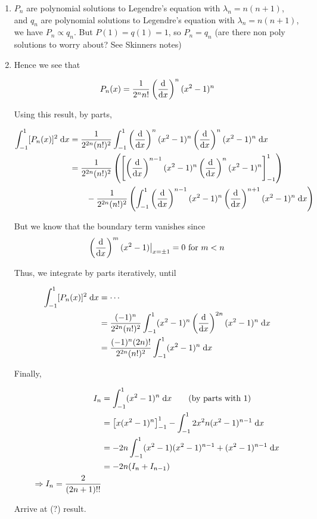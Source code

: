 \documentclass[a4paper]{article}
\begin{document}
\begin{enumerate}
	\item $ P_{n} $ are polynomial solutions to Legendre's equation with $ \lambda_{n} = n(n+1) $, and $ q_{n} $ are polynomial solutions to Legendre's equation with $ \lambda_{n} = n(n+1) $, we have $ P_{n} \propto q_{n} $. But $ P(1) = q(1) = 1 $, so $ P_{n} = q_{n} $ (are there non poly solutions to worry about? See Skinners notes) 
	
	\item Hence we see that
	
	\[ P_{n}(x) = \frac{1}{2^{n} n!} \left(  \frac{\mathrm{d} }{\mathrm{d} x}   \right)^{n} (x^{2} - 1)^{n}   \]
	
	Using this result, by parts, 
	
	\begin{align*}
	\int_{-1}^{1} [  P_{n} (x)  ]^{2} \; \mathrm{d} x & = \frac{1}{2^{2n} (n!)^{2}} \int_{-1}^{1} \left(  \frac{\mathrm{d} }{\mathrm{d} x}   \right)^{n} (x^{2} - 1)^{n} \left(  \frac{\mathrm{d} }{\mathrm{d} x}   \right)^{n} (x^{2} - 1)^{n} \; \mathrm{d} x   \\
	& = \frac{1}{2^{2n} (n!)^{2}} \left( \left[  \left(  \frac{\mathrm{d} }{\mathrm{d} x}   \right)^{n-1} (x^{2} - 1)^{n} \left(  \frac{\mathrm{d} }{\mathrm{d} x}   \right)^{n} (x^{2} - 1)^{n} \right]_{-1}^{1} \right)  \\
	& \qquad - \frac{1}{2^{2n} (n!)^{2}} \left(     \int_{-1}^{1} \left(  \frac{\mathrm{d} }{\mathrm{d} x}   \right)^{n-1} (x^{2} - 1)^{n} \left(  \frac{\mathrm{d} }{\mathrm{d} x}   \right)^{n+1} (x^{2} - 1)^{n} \; \mathrm{d} x \right)  
	\end{align*}
	
	
	But we know that the boundary term vanishes since \[ \left( \frac{\mathrm{d} }{\mathrm{d} x} \right)^{m} (x^{2} - 1) \big|_{x= \pm 1} = 0 \text{ for } m < n   \]
	
	Thus, we integrate by parts iteratively, until 
	
	\begin{align*}
	\int_{-1}^{1} [  P_{n} (x)  ]^{2} \; \mathrm{d} x & = \cdots \\
	 & = \frac{(-1)^{n}}{2^{2n} (n!)^{2}} \int_{-1}^{1} (x^{2} - 1)^{n} \left(  \frac{\mathrm{d} }{\mathrm{d} x}   \right)^{2n} (x^{2} - 1)^{n} \; \mathrm{d} x   \\
	 & = \frac{(-1)^{n}(2n)!}{2^{2n} (n!)^{2}} \int_{-1}^{1} (x^{2} - 1)^{n}  \; \mathrm{d} x 
	\end{align*}
	
	Finally,
	
	\begin{align*}
	I_{n} & = \int_{-1}^{1}  (x^{2} - 1)^{n} \; \mathrm{d} x  \qquad (\text{by parts with } 1)\\
	& = \left[  x(x^{2} - 1)^{n} \right]_{-1}^{1} - \int_{-1}^{1} 2x^{2} n (x^{2} - 1)^{n-1} \; \mathrm{d} x\\
	& = - 2 n  \int_{-1}^{1} (x^{2} - 1) (x^{2} - 1)^{n-1} + (x^{2} - 1)^{n-1} \; \mathrm{d} x \\
	& = -2n (  I_{n}+ I_{n-1}) \\
	\Rightarrow I_{n} = \frac{2}{(2n+1)!!}
	\end{align*}
	
	Arrive at (?) result.
 	
\end{enumerate}
\end{document}
